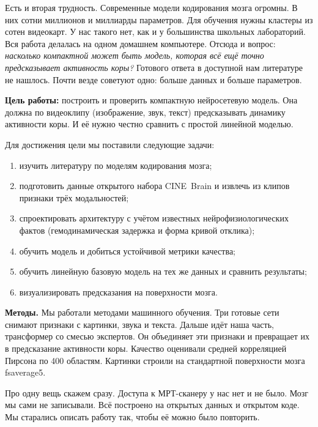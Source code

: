\documentclass[12pt,a4paper]{article}
\begin{document}
Есть и вторая трудность. Современные модели кодирования мозга огромны.
В них сотни миллионов и миллиарды параметров. Для обучения нужны
кластеры из сотен видеокарт. У нас такого нет, как и у большинства
школьных лабораторий. Вся работа делалась на одном домашнем компьютере.
Отсюда и вопрос: \emph{насколько компактной может быть модель, которая
всё ещё точно предсказывает активность коры?} Готового ответа в
доступной нам литературе не нашлось. Почти везде советуют одно: больше
данных и больше параметров.

\textbf{Цель работы:} построить и проверить компактную нейросетевую
модель. Она должна по видеоклипу (изображение, звук, текст)
предсказывать динамику активности коры. И её нужно честно сравнить с
простой линейной моделью.

Для достижения цели мы поставили следующие задачи:
\begin{enumerate}
    \item изучить литературу по моделям кодирования мозга;
    \item подготовить данные открытого набора CINE~Brain и извлечь из
          клипов признаки трёх модальностей;
    \item спроектировать архитектуру с учётом известных
          нейрофизиологических фактов (гемодинамическая задержка и
          форма кривой отклика);
    \item обучить модель и добиться устойчивой метрики качества;
    \item обучить линейную базовую модель на тех же данных и сравнить
          результаты;
    \item визуализировать предсказания на поверхности мозга.
\end{enumerate}

\textbf{Методы.} Мы работали методами машинного обучения. Три готовые
сети снимают признаки с картинки, звука и текста. Дальше идёт наша
часть, трансформер со смесью экспертов. Он объединяет эти признаки и
превращает их в предсказание активности коры. Качество оценивали
средней корреляцией Пирсона по 400 областям. Картинки строили на
стандартной поверхности мозга fsaverage5.

Про одну вещь скажем сразу. Доступа к МРТ-сканеру у нас нет и не было.
Мозг мы сами не записывали. Всё построено на открытых данных и открытом
коде. Мы старались описать работу так, чтобы её можно было повторить.

\newpage

\end{document}
